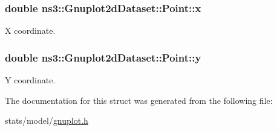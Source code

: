 \subsubsection[{\texorpdfstring{x}{x}}]{\setlength{\rightskip}{0pt plus 5cm}double ns3\+::\+Gnuplot2d\+Dataset\+::\+Point\+::x}\hypertarget{structns3_1_1Gnuplot2dDataset_1_1Point_ac7d609ad6a11724e91d5eb063788c41c}{}\label{structns3_1_1Gnuplot2dDataset_1_1Point_ac7d609ad6a11724e91d5eb063788c41c}


X coordinate. 

\subsubsection[{\texorpdfstring{y}{y}}]{\setlength{\rightskip}{0pt plus 5cm}double ns3\+::\+Gnuplot2d\+Dataset\+::\+Point\+::y}\hypertarget{structns3_1_1Gnuplot2dDataset_1_1Point_a10456985b5581ce8b2c04a35d41f13f6}{}\label{structns3_1_1Gnuplot2dDataset_1_1Point_a10456985b5581ce8b2c04a35d41f13f6}


Y coordinate. 



The documentation for this struct was generated from the following file\+:\begin{DoxyCompactItemize}
\item 
stats/model/\hyperlink{gnuplot_8h}{gnuplot.\+h}\end{DoxyCompactItemize}

